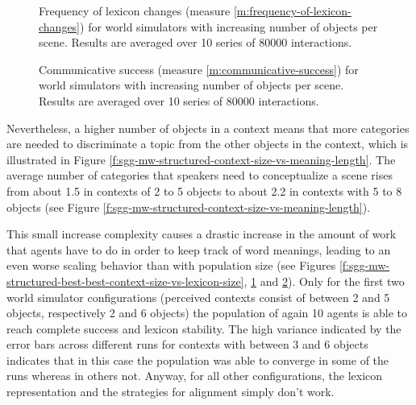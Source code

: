 \begin{figure}[p]
  \caption{Frequency of lexicon changes (measure
    \ref{m:frequency-of-lexicon-changes}) for world simulators with
    increasing number of objects per scene. Results are averaged over
    10 series of 80000 interactions. }
  \label{f:sgg-mw-structured-best-best-context-size-vs-lexicon-changes}
\end{figure}

\begin{figure}[p]
  \caption{Communi\-cative success (measure
    \ref{m:communicative-success}) for world simulators with
    increasing number of objects per scene. Results are averaged over
    10 series of 80000 interactions. }
  \label{f:sgg-mw-structured-best-best-context-size-vs-communicative-success}
\end{figure}

\stopfiguregroup


Nevertheless, a higher number of objects in a context means that more
categories are needed to discriminate a topic from the other objects
in the context, which is illustrated in Figure
\ref{f:sgg-mw-structured-context-size-vs-meaning-length}. The average
number of categories that speakers need to conceptualize a scene rises
from about 1.5 in contexts of 2 to 5 objects to about 2.2 in contexts
with 5 to 8 objects (see Figure
\ref{f:sgg-mw-structured-context-size-vs-meaning-length}).

This small increase complexity causes a drastic increase in the amount
of work that agents have to do in order to keep track of word
meanings, leading to an even worse scaling behavior than with
population size (see Figures
\ref{f:sgg-mw-structured-best-best-context-size-vs-lexicon-size},
\ref{f:sgg-mw-structured-best-best-context-size-vs-lexicon-changes}
and
\ref{f:sgg-mw-structured-best-best-context-size-vs-communicative-success}). Only
for the first two world simulator configurations (perceived contexts
consist of between 2 and 5 objects, respectively 2 and 6 objects) the
population of again 10 agents is able to reach complete success and
lexicon stability. The high variance indicated by the error bars
across different runs for contexts with between 3 and 6 objects
indicates that in this case the population was able to converge in
some of the runs whereas in others not. Anyway, for all other
configurations, the lexicon representation and the strategies for
alignment simply don't work.



